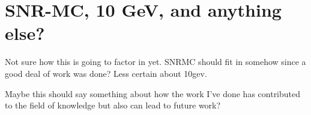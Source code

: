 \chapter{SNR-MC, 10 GeV, and anything else?}
\label{chap:other}

Not sure how this is going to factor in yet. \gls{SNRMC} should fit in somehow since a good deal of work was done? Less certain about 10gev. 

Maybe this should say something about how the work I've done has contributed to the field of knowledge but also can lead to future work?